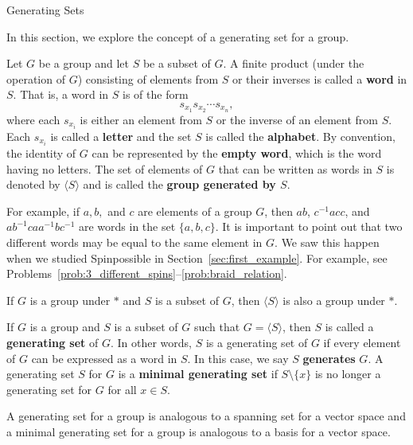 
\begin{section}{Generating Sets}


In this section, we explore the concept of a generating set for a group.

\begin{definition}
Let $G$ be a group and let $S$ be a subset of $G$. A finite product (under the operation of $G$) consisting of elements from $S$ or their inverses is called a \textbf{word} in $S$. That is, a word in $S$ is of the form
\[
s_{x_1}s_{x_2}\cdots s_{x_n},
\]
where each $s_{x_i}$ is either an element from $S$ or the inverse of an element from $S$. Each $s_{x_i}$ is called a \textbf{letter} and the set $S$ is called the \textbf{alphabet}. By convention, the identity of $G$ can be represented by the \textbf{empty word}, which is the word having no letters. The set of elements of $G$ that can be written as words in $S$ is denoted by $\langle S\rangle$ and is called the \textbf{group generated by $S$}.
\end{definition}

For example, if $a, b,$ and $c$ are elements of a group $G$, then $ab$, $c^{-1}acc$, and $ab^{-1}caa^{-1}bc^{-1}$ are words in the set $\{a,b,c\}$.  It is important to point out that two different words may be equal to the same element in $G$. We saw this happen when we studied Spinpossible in Section~\ref{sec:first_example}. For example, see Problems~\ref{prob:3_different_spins}--\ref{prob:braid_relation}.

\begin{theorem}
If $G$ is a group under $*$ and $S$ is a subset of $G$, then $\langle S\rangle$ is also a group under $*$.
\end{theorem}

\begin{definition}
If $G$ is a group and $S$ is a subset of $G$ such that $G=\langle S\rangle$, then $S$ is called a \textbf{generating set} of $G$. In other words, $S$ is a generating set of $G$ if every element of $G$ can be expressed as a word in $S$.  In this case, we say $S$ \textbf{generates} $G$.  A generating set $S$ for $G$ is a \textbf{minimal generating set} if $S\setminus\{x\}$ is no longer a generating set for $G$ for all $x\in S$.
\end{definition}

A generating set for a group is analogous to a spanning set for a vector space and a minimal generating set for a group is analogous to a basis for a vector space.  


\end{section}
